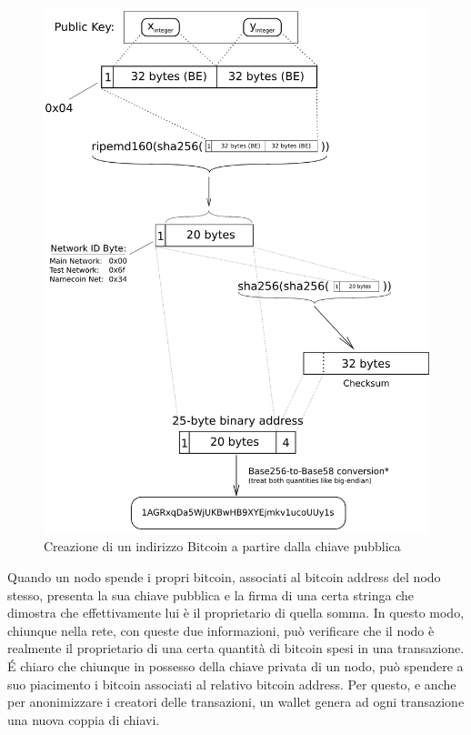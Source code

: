 \begin{figure}[p]
	\centering
	\includegraphics[]{img/capuno/PubKeyToAddr.png}
	\caption{Creazione di un indirizzo Bitcoin a partire dalla chiave pubblica~\emph{\cite{bitaddress2020}}}
	\label{fig:bit_address}
\end{figure}

Quando un nodo spende i propri bitcoin, associati al bitcoin address del nodo stesso, presenta la sua chiave pubblica e la firma di una certa stringa che dimostra che effettivamente lui è il proprietario di quella somma. In questo modo, chiunque nella rete, con queste due informazioni, può verificare che il nodo è realmente il proprietario di una certa quantità di bitcoin spesi in una transazione. \'E chiaro che chiunque in possesso della chiave privata di un nodo, può spendere a suo piacimento i bitcoin associati al relativo bitcoin address. Per questo, e anche per anonimizzare i creatori delle transazioni, un wallet genera ad ogni transazione una nuova coppia di chiavi.

